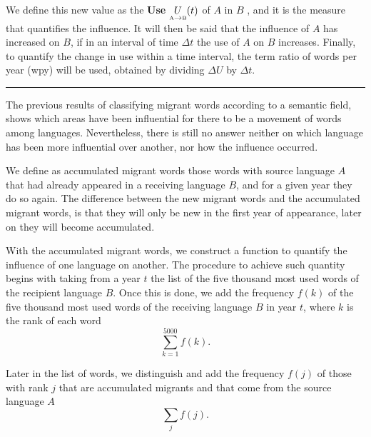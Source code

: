 \documentclass[10pt,letterpaper]{article} %
\begin{document}
	We define this new value as the \textbf{Use} $\underset{ \text{\tiny A} \to \text{\tiny B} }{U}(t)$ of $A$ in $B$ , and it is the measure that quantifies the influence. It will then be said that the influence of $A$ has increased on $B$, if in an interval of time $\Delta t$ the use of $A$ on $B$ increases. Finally, to quantify the change in use within a time interval, the term ratio of words per year (wpy) will be used, obtained by dividing $\Delta U$  by  $\Delta t$.
	
	
	\noindent\rule{10cm}{0.4pt}
	
	The previous results of classifying migrant words according to a semantic
	field, shows which areas have been influential for there to be a movement of
	words among languages. Nevertheless, there is still no answer neither on which
	language has been more influential over another, nor how the influence
	occurred.
	
	We define as accumulated migrant words those words with source language $A$
	that had already appeared in a receiving language $B$, and for a given year
	they do so again. The difference between the new migrant words and the
	accumulated migrant words, is that they will only be new in the first year of
	appearance, later on they will become accumulated.
	
	With the accumulated migrant words, we construct a function to quantify the
	influence of one language on 
	another. The procedure to
	achieve such quantity begins with taking from a year $t$ the list of the five
	thousand most used words of the recipient language $B$. Once this is done, we
	add the frequency $f(k)$ of the five thousand most used words of the receiving
	language $B$ in year $t$, where $k$ is the rank of each word
	\begin{equation}
	\label{ec.ftot}
	\sum_{k=1}^{5000} f(k).
	\end{equation}
	
	Later in the list of words, we distinguish and add the frequency $f(j)$  of
	those with rank $j$ that are accumulated migrants and that come from the source
	language $A$ 
	\begin{equation}
	\label{ec.fpres}
	\sum_{j} f(j).
	\end{equation}
	
\end{document}
